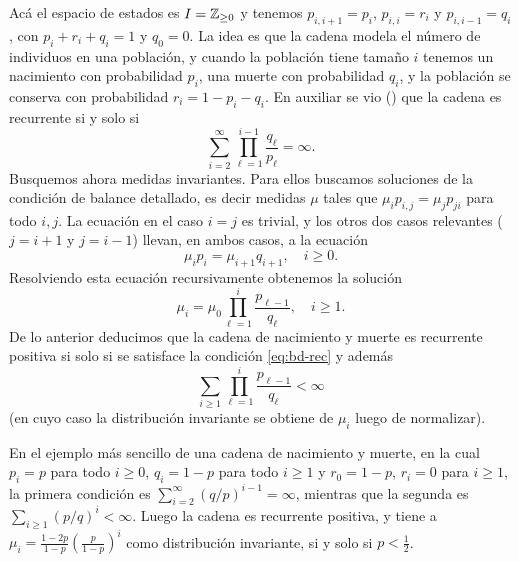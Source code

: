 \begin{ex}
Acá el espacio de estados es $I=\mathbb{Z}_{\geq0}$ y tenemos $p_{i,i+1}=p_i$, $p_{i,i}=r_i$ y $p_{i,i-1}=q_i$, con $p_i+r_i+q_i=1$ y $q_0=0$.
La idea es que la cadena modela el número de individuos en una población, y cuando la población tiene tamaño $i$ tenemos un nacimiento con probabilidad $p_i$, una muerte con probabilidad $q_i$, y la población se conserva con probabilidad $r_i=1-p_i-q_i$.
En auxiliar se vio (\ucmark) que la cadena es recurrente si y solo si
\begin{equation}
\sum_{i=2}^{\infty}\prod_{\ell=1}^{i-1}\frac{q_\ell}{p_\ell}=\infty.\label{eq:bd-rec}
\end{equation}
Busquemos ahora medidas invariantes.
Para ellos buscamos soluciones de la condición de balance detallado, es decir medidas $\mu$ tales que $\mu_ip_{i,j}=\mu_jp_{ji}$ para todo $i,j$.
La ecuación en el caso $i=j$ es trivial, y los otros dos casos relevantes ($j=i+1$ y $j=i-1$) llevan, en ambos casos, a la ecuación
\[\mu_ip_i=\mu_{i+1}q_{i+1},\quad i\geq0.\]
Resolviendo esta ecuación recursivamente obtenemos la solución
\[\mu_i=\mu_0\prod_{\ell=1}^i\frac{p_{\ell-1}}{q_\ell},\quad i\geq1.\]
De lo anterior deducimos que la cadena de nacimiento y muerte es recurrente positiva si solo si se satisface la condición \eqref{eq:bd-rec} y además
\[\sum_{i\geq1}\prod_{\ell=1}^i\frac{p_{\ell-1}}{q_\ell}<\infty\]
(en cuyo caso la distribución invariante se obtiene de $\mu_i$ luego de normalizar).

\noindent En el ejemplo más sencillo de una cadena de nacimiento y muerte, en la cual $p_i=p$ para todo $i\geq0$, $q_i=1-p$ para todo $i\geq1$ y $r_0=1-p$, $r_i=0$ para $i\geq1$, la primera condición es $\sum_{i=2}^{\infty}(q/p)^{i-1}=\infty$, mientras que la segunda es $\sum_{i\geq1}(p/q)^i<\infty$.
Luego la cadena es recurrente positiva, y tiene a $\mu_i=\frac{1-2p}{1-p}\left(\frac{p}{1-p}\right)^i$ como distribución invariante, si y solo si $p<\frac12$.
\end{ex}

